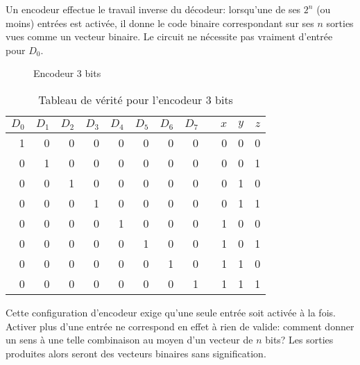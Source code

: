 \documentclass[letter, oneside]{book}
\begin{document}
Un encodeur effectue le travail inverse du décodeur: lorsqu'une de ses
\(2^n\) (ou moins) entrées est activée, il donne le code binaire
correspondant sur ses \(n\) sorties vues comme un vecteur binaire. Le
circuit ne nécessite pas vraiment d'entrée pour \(D_0\).


\begin{figure}[htbp]
\centering

\caption{\label{fig:org916aa71}Encodeur 3 bits}
\end{figure}


\begin{table}[htbp]
\caption{\label{tab:orga8674ac}Tableau de vérité pour l'encodeur 3 bits}
\centering
\begin{tabular}{rrrrrrrrlrrr}
\(D_0\) & \(D_1\) & \(D_2\) & \(D_3\) & \(D_4\) & \(D_5\) & \(D_6\) & \(D_7\) &  & \(x\) & \(y\) & \(z\)\\[0pt]
\hline
1 & 0 & 0 & 0 & 0 & 0 & 0 & 0 &  & 0 & 0 & 0\\[0pt]
0 & 1 & 0 & 0 & 0 & 0 & 0 & 0 &  & 0 & 0 & 1\\[0pt]
0 & 0 & 1 & 0 & 0 & 0 & 0 & 0 &  & 0 & 1 & 0\\[0pt]
0 & 0 & 0 & 1 & 0 & 0 & 0 & 0 &  & 0 & 1 & 1\\[0pt]
0 & 0 & 0 & 0 & 1 & 0 & 0 & 0 &  & 1 & 0 & 0\\[0pt]
0 & 0 & 0 & 0 & 0 & 1 & 0 & 0 &  & 1 & 0 & 1\\[0pt]
0 & 0 & 0 & 0 & 0 & 0 & 1 & 0 &  & 1 & 1 & 0\\[0pt]
0 & 0 & 0 & 0 & 0 & 0 & 0 & 1 &  & 1 & 1 & 1\\[0pt]
\end{tabular}
\end{table}

Cette configuration d'encodeur exige qu'une seule entrée soit
activée à la fois. Activer plus d'une entrée ne correspond en effet à
rien de valide: comment donner un sens à une telle combinaison au
moyen d'un vecteur de \(n\) bits? Les sorties produites alors seront
des vecteurs binaires sans signification.
\end{document}
